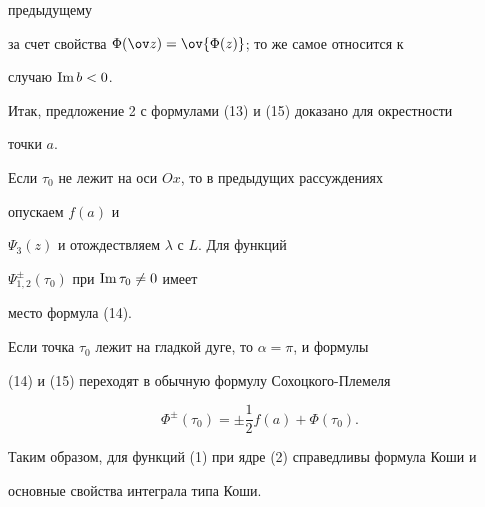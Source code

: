предыдущему 


за счет свойства $\Phi(\ov z)=\ov{\Phi(z)}$; то же самое относится к 


случаю $\text{Im\,} b<0$. 


 


Итак, предложение 2 с формулами (13) и (15) доказано для окрестности 


точки $a$. 


 


Если $\tau_0$ не лежит на оси $Ox$, то в предыдущих рассуждениях 


опускаем $f(a)$ и 


$\Psi_3(z)$ и отождествляем $\lambda$ с $L$. Для функций 


$\Psi^\pm_{1,2}(\tau_0)$ при $\operatorname{Im}\tau_0\ne 0$ имеет 


место формула (14). 


 


Если точка $\tau_0$ лежит на гладкой дуге, то $\alpha=\pi$, и формулы 


(14) и (15) переходят в обычную формулу Сохоцкого-Племеля 


$$ 


\Phi^\pm(\tau_0)=\pm\frac{1}{2}f(a)+\Phi(\tau_0). 


$$ 


 


Таким образом, для функций (1) при ядре (2) справедливы формула Коши и 


основные свойства интеграла типа Коши. 


 


